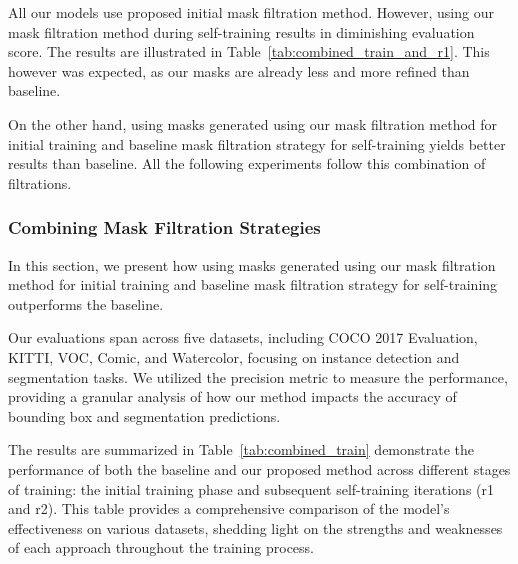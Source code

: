All our models use proposed initial mask filtration method. However, using our mask filtration method during self-training results in diminishing evaluation score. The results are illustrated in Table~\ref{tab:combined_train_and_r1}. This however was expected, as our masks are already less and more refined than baseline.

On the other hand, using masks generated using our mask filtration method for initial training and baseline mask filtration strategy for self-training yields better results than baseline. All the following experiments follow this combination of filtrations.

\subsubsection{Combining Mask Filtration Strategies}

In this section, we present how using masks generated using our mask filtration method for initial training and baseline mask filtration strategy for self-training outperforms the baseline. 

Our evaluations span across five datasets, including COCO 2017 Evaluation, KITTI, VOC, Comic, and Watercolor, focusing on instance detection and segmentation tasks. We utilized the precision metric to measure the performance, providing a granular analysis of how our method impacts the accuracy of bounding box and segmentation predictions.

The results are summarized in Table~\ref{tab:combined_train} demonstrate the performance of both the baseline and our proposed method across different stages of training: the initial training phase and subsequent self-training iterations (r1 and r2). This table provides a comprehensive comparison of the model’s effectiveness on various datasets, shedding light on the strengths and weaknesses of each approach throughout the training process.


